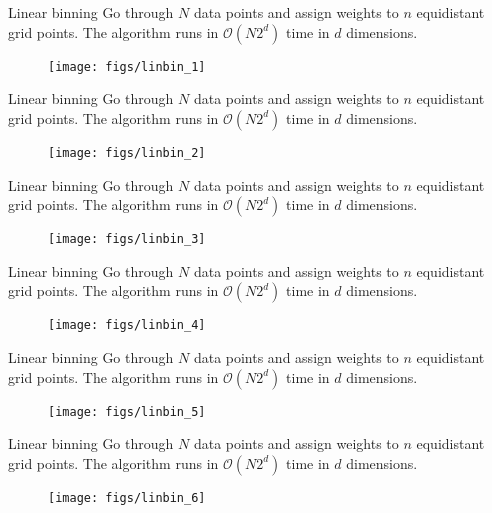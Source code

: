 \documentclass[11pt, aspectratio=149]{beamer}
\theoremstyle{plain}
\begin{document}
\begin{frame}[fragile, t]{Linear binning}
	Go through $N$ data points and assign weights to $n$ equidistant grid points. The algorithm runs in $\mathcal{O}(N2^d)$ time in $d$ dimensions.
	\vfill
	\begin{figure}
		\centering
		\texttt{[image: figs/linbin\_1]}
	\end{figure}
\end{frame}


\begin{frame}[fragile, t]{Linear binning}
	Go through $N$ data points and assign weights to $n$ equidistant grid points. The algorithm runs in $\mathcal{O}(N2^d)$ time in $d$ dimensions.
	\vfill
	\begin{figure}
		\centering
		\texttt{[image: figs/linbin\_2]}
	\end{figure}
\end{frame}


\begin{frame}[fragile, t]{Linear binning}
	Go through $N$ data points and assign weights to $n$ equidistant grid points. The algorithm runs in $\mathcal{O}(N2^d)$ time in $d$ dimensions.
	\vfill
	\begin{figure}
		\centering
		\texttt{[image: figs/linbin\_3]}
	\end{figure}
\end{frame}


\begin{frame}[fragile, t]{Linear binning}
	Go through $N$ data points and assign weights to $n$ equidistant grid points. The algorithm runs in $\mathcal{O}(N2^d)$ time in $d$ dimensions.
	\vfill
	\begin{figure}
		\centering
		\texttt{[image: figs/linbin\_4]}
	\end{figure}
\end{frame}


\begin{frame}[fragile, t]{Linear binning}
	Go through $N$ data points and assign weights to $n$ equidistant grid points. The algorithm runs in $\mathcal{O}(N2^d)$ time in $d$ dimensions.
	\vfill
	\begin{figure}
		\centering
		\texttt{[image: figs/linbin\_5]}
	\end{figure}
\end{frame}


\begin{frame}[fragile, t]{Linear binning}
	Go through $N$ data points and assign weights to $n$ equidistant grid points. The algorithm runs in $\mathcal{O}(N2^d)$ time in $d$ dimensions.
	\vfill
	\begin{figure}
		\centering
		\texttt{[image: figs/linbin\_6]}
	\end{figure}
\end{frame}
\end{document}
